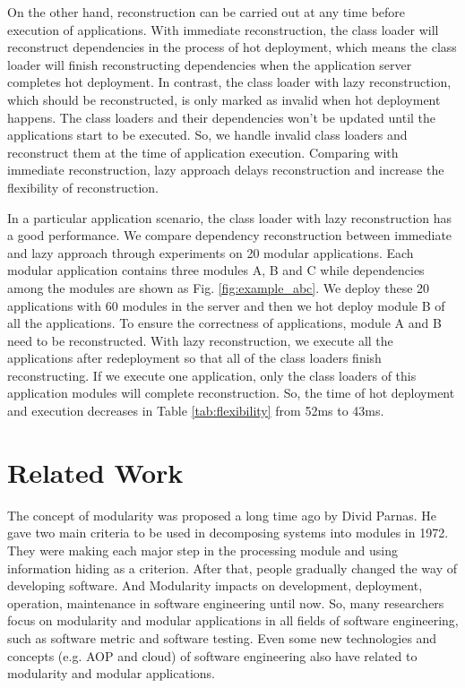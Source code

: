\documentclass[conference]{IEEEtran}
\begin{document}
On the other hand, reconstruction can be carried out at any time before execution of applications.
With immediate reconstruction, the class loader will reconstruct dependencies in the process of hot deployment, which means the class loader will finish reconstructing dependencies when the application server completes hot deployment.
In contrast, the class loader with lazy reconstruction, which should be reconstructed, is only marked as invalid when hot deployment happens.
The class loaders and their dependencies won't be updated until the applications start to be executed.
So, we handle invalid class loaders and reconstruct them at the time of application execution.
Comparing with immediate reconstruction, lazy approach delays reconstruction and increase the flexibility of reconstruction.

In a particular application scenario, the class loader with lazy reconstruction has a good performance. 
We compare dependency reconstruction between immediate and lazy approach through experiments on 20 modular applications.
Each modular application contains three modules A, B and C while dependencies among the modules are shown as Fig. \ref{fig:example_abc}.
We deploy these 20 applications with 60 modules in the server and then we hot deploy module B of all the applications.
To ensure the correctness of applications, module A and B need to be reconstructed.
With lazy reconstruction, we execute all the applications after redeployment so that all of the class loaders finish reconstructing.
If we execute one application, only the class loaders of this application modules will complete reconstruction.
So, the time of hot deployment and execution decreases in Table \ref{tab:flexibility} from 52ms to 43ms. 



\section{Related Work\label{sec:relatedwork}}

The concept of modularity was proposed a long time ago by Divid Parnas\cite{Divid_specification}.
He gave two main criteria\cite{Divid_criteria} to be used in decomposing systems into modules in 1972.
They were making each major step in the processing module and using information hiding as a criterion.
After that, people gradually changed the way of developing software.
And Modularity impacts on development, deployment, operation, maintenance in software engineering until now.
So, many researchers focus on modularity and modular applications in all fields of software engineering, such as software metric\cite{module_metric} and software testing\cite{module_test}.
Even some new technologies and concepts (e.g. AOP\cite{module_aop} and cloud\cite{module_cloud}) of software engineering also have related to modularity and modular applications.
\end{document}

